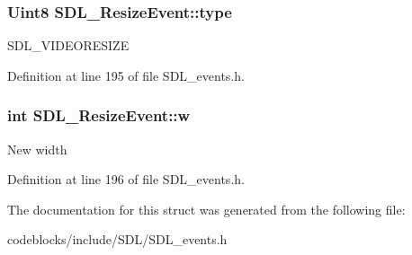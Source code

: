 \hypertarget{structSDL__ResizeEvent_a0f35cba640e999f4dd77e4267b812525}{
\subsubsection[{type}]{\setlength{\rightskip}{0pt plus 5cm}Uint8 S\+D\+L\+\_\+\+Resize\+Event\+::type}}\label{structSDL__ResizeEvent_a0f35cba640e999f4dd77e4267b812525}
S\+D\+L\+\_\+\+V\+I\+D\+E\+O\+R\+E\+S\+I\+Z\+E 

Definition at line 195 of file S\+D\+L\+\_\+events.\+h.

\hypertarget{structSDL__ResizeEvent_acd9eca9322c2d247bb0329e2ea97fc0f}{
\subsubsection[{w}]{\setlength{\rightskip}{0pt plus 5cm}int S\+D\+L\+\_\+\+Resize\+Event\+::w}}\label{structSDL__ResizeEvent_acd9eca9322c2d247bb0329e2ea97fc0f}
New width 

Definition at line 196 of file S\+D\+L\+\_\+events.\+h.



The documentation for this struct was generated from the following file\+:\begin{DoxyCompactItemize}
\item 
codeblocks/include/\+S\+D\+L/S\+D\+L\+\_\+events.\+h\end{DoxyCompactItemize}
